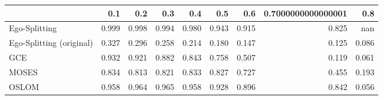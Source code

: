 \begin{tabular}{lrrrrrrrr}
\toprule
{} &   0.1 &   0.2 &   0.3 &   0.4 &   0.5 &   0.6 & 0.7000000000000001 &   0.8 \\
\midrule
Ego-Splitting            & 0.999 & 0.998 & 0.994 & 0.980 & 0.943 & 0.915 &              0.825 &   nan \\
Ego-Splitting (original) & 0.327 & 0.296 & 0.258 & 0.214 & 0.180 & 0.147 &              0.125 & 0.086 \\
GCE                      & 0.932 & 0.921 & 0.882 & 0.843 & 0.758 & 0.507 &              0.119 & 0.061 \\
MOSES                    & 0.834 & 0.813 & 0.821 & 0.833 & 0.827 & 0.727 &              0.455 & 0.193 \\
OSLOM                    & 0.958 & 0.964 & 0.965 & 0.958 & 0.928 & 0.896 &              0.842 & 0.056 \\
\bottomrule
\end{tabular}
